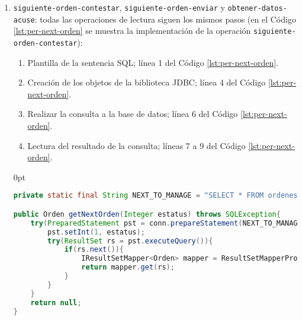\begin{enumerate}
	\item \texttt{siguiente-orden-contestar}, \texttt{siguiente-orden-enviar} y \texttt{obtener-datos-acuse}: todas las operaciones de lectura siguen los mismos pasos (en el Código \ref{lst:per-next-orden} se muestra la implementación de la operación \texttt{siguiente-orden-contestar}):
	\begin{enumerate}
		\item Plantilla de la sentencia SQL; línea 1 del Código \ref{lst:per-next-orden}.
		\item Creación de los objetos de la biblioteca JDBC; línea 4 del Código \ref{lst:per-next-orden}.
		\item Realizar la consulta a la base de datos; línea 6 del Código \ref{lst:per-next-orden}.
		\item Lectura del resultado de la consulta; líneas 7 a 9 del Código \ref{lst:per-next-orden}.
	\end{enumerate}
	\begin{adjustwidth}{\listingfixwidth}{0pt}
	\begin{lstlisting}[language=Java, caption={Lectura de una orden de reposición desde la base de datos.}, captionpos=b, label={lst:per-next-orden}]
private static final String NEXT_TO_MANAGE = "SELECT * FROM ordenes WHERE estatus = ? ORDER BY fecha_insersion LIMIT 1";

public Orden getNextOrden(Integer estatus) throws SQLException{
	try(PreparedStatement pst = conn.prepareStatement(NEXT_TO_MANAGE)){
		pst.setInt(1, estatus);
		try(ResultSet rs = pst.executeQuery()){
    		if(rs.next()){
    			IResultSetMapper<Orden> mapper = ResultSetMapperProvider.getInstance().get(Orden.class);
    			return mapper.get(rs);
    		}
		}
	}
	return null;
}
	\end{lstlisting}
	\end{adjustwidth}
\end{enumerate}
